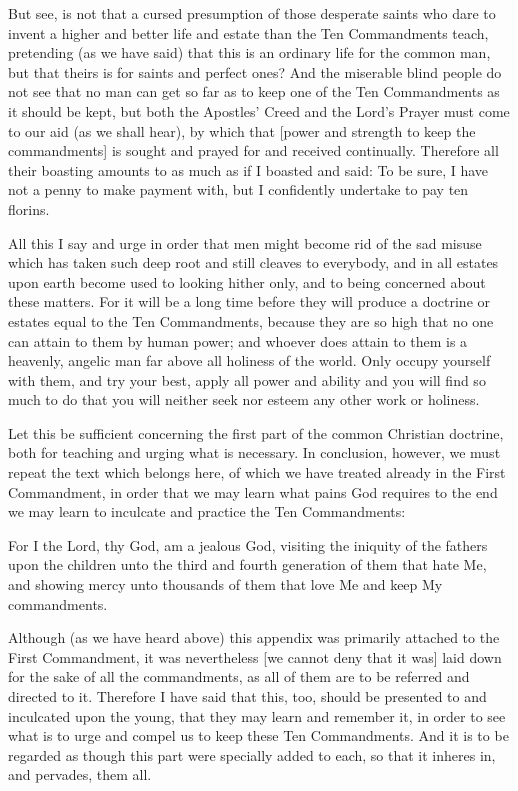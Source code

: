 But see, is not that a cursed presumption of those desperate saints who
dare to invent a higher and better life and estate than the Ten
Commandments teach, pretending (as we have said) that this is an
ordinary life for the common man, but that theirs is for saints and
perfect ones? And the miserable blind people do not see that no man can
get so far as to keep one of the Ten Commandments as it should be kept,
but both the Apostles' Creed and the Lord's Prayer must come to our aid
(as we shall hear), by which that [power and strength to keep the
commandments] is sought and prayed for and received continually.
Therefore all their boasting amounts to as much as if I boasted and
said: To be sure, I have not a penny to make payment with, but I
confidently undertake to pay ten florins.

All this I say and urge in order that men might become rid of the sad
misuse which has taken such deep root and still cleaves to everybody,
and in all estates upon earth become used to looking hither only, and
to being concerned about these matters. For it will be a long time
before they will produce a doctrine or estates equal to the Ten
Commandments, because they are so high that no one can attain to them
by human power; and whoever does attain to them is a heavenly, angelic
man far above all holiness of the world. Only occupy yourself with
them, and try your best, apply all power and ability and you will find
so much to do that you will neither seek nor esteem any other work or
holiness.

Let this be sufficient concerning the first part of the common
Christian doctrine, both for teaching and urging what is necessary. In
conclusion, however, we must repeat the text which belongs here, of
which we have treated already in the First Commandment, in order that
we may learn what pains God requires to the end we may learn to
inculcate and practice the Ten Commandments:

For I the Lord, thy God, am a jealous God, visiting the iniquity of the
fathers upon the children unto the third and fourth generation of them
that hate Me, and showing mercy unto thousands of them that love Me and
keep My commandments.

Although (as we have heard above) this appendix was primarily attached
to the First Commandment, it was nevertheless [we cannot deny that it
was] laid down for the sake of all the commandments, as all of them are
to be referred and directed to it. Therefore I have said that this,
too, should be presented to and inculcated upon the young, that they
may learn and remember it, in order to see what is to urge and compel
us to keep these Ten Commandments. And it is to be regarded as though
this part were specially added to each, so that it inheres in, and
pervades, them all.

